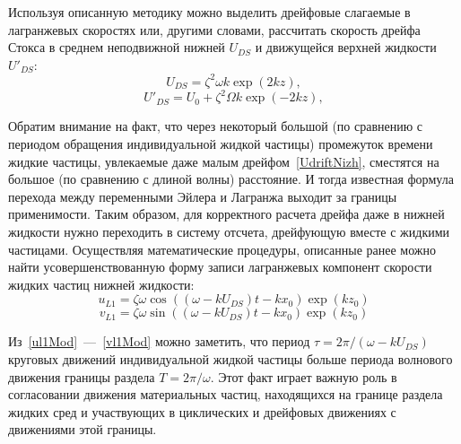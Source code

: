 Используя описанную методику можно выделить дрейфовые слагаемые в лагранжевых скоростях или, другими словами, рассчитать скорость дрейфа Стокса в среднем неподвижной нижней $ U_{DS} $ и движущейся верхней жидкости $ U'_{DS} $:
\begin{equation}
U_{DS}=\zeta^{2} \omega k \exp \left(2 k z\right),
\label{UdriftNizh}
\end{equation}
\begin{equation}
U'_{DS}=U_{0}+\zeta^{2} \Omega k \exp \left(-2 k z\right),
\label{UdriftVerh}
\end{equation}


Обратим внимание на факт, что через некоторый большой (по сравнению с периодом обращения индивидуальной жидкой частицы) промежуток времени жидкие частицы, увлекаемые даже малым дрейфом~\eqref{UdriftNizh}, сместятся на большое (по сравнению с длиной волны) расстояние. И тогда известная формула перехода между переменными Эйлера и Лагранжа выходит за границы применимости. Таким образом, для корректного расчета дрейфа даже в нижней жидкости нужно переходить в систему отсчета, дрейфующую вместе с жидкими частицами. Осуществляя математические процедуры, описанные ранее можно найти усовершенствованную форму записи лагранжевых компонент скорости жидких частиц нижней жидкости:
\begin{equation}
u_{L1}=\zeta \omega \cos \left( \left( \omega - k U_{DS} \right) t- k x_{0} \right) \exp \left( k z_{0} \right)
\label{ul1Mod}
\end{equation}
\begin{equation}
v_{L1}=\zeta \omega \sin \left( \left( \omega - k U_{DS} \right) t- k x_{0} \right) \exp \left( k z_{0} \right)
\label{vl1Mod}
\end{equation}

Из~\eqref{ul1Mod}~---~\eqref{vl1Mod} можно заметить, что период $ \tau=2\pi / \left( \omega - k U_{DS} \right) $ круговых движений индивидуальной жидкой частицы больше периода волнового движения границы раздела $ T=2\pi / \omega $. Этот факт играет важную роль в согласовании движения материальных частиц, находящихся на границе раздела жидких сред и участвующих в циклических и дрейфовых движениях с движениями этой границы. 

